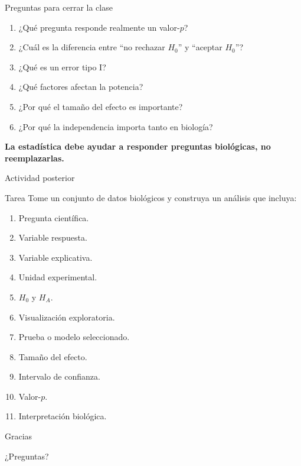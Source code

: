 \begin{frame}{Preguntas para cerrar la clase}

\begin{enumerate}
    \item ¿Qué pregunta responde realmente un valor-$p$?
    \item ¿Cuál es la diferencia entre ``no rechazar $H_0$''
    y ``aceptar $H_0$''?
    \item ¿Qué es un error tipo I?
    \item ¿Qué factores afectan la potencia?
    \item ¿Por qué el tamaño del efecto es importante?
    \item ¿Por qué la independencia importa tanto en biología?
\end{enumerate}

\vspace{0.5cm}

\centering
\Large
\textbf{La estadística debe ayudar a responder preguntas biológicas,
no reemplazarlas.}

\end{frame}

\begin{frame}{Actividad posterior}

\begin{block}{Tarea}
Tome un conjunto de datos biológicos y construya un análisis que incluya:
\end{block}

\begin{enumerate}
    \item Pregunta científica.
    \item Variable respuesta.
    \item Variable explicativa.
    \item Unidad experimental.
    \item $H_0$ y $H_A$.
    \item Visualización exploratoria.
    \item Prueba o modelo seleccionado.
    \item Tamaño del efecto.
    \item Intervalo de confianza.
    \item Valor-$p$.
    \item Interpretación biológica.
\end{enumerate}

\end{frame}

\begin{frame}
\centering
\Huge
\textcolor{bioGreen}{Gracias}

\vspace{0.5cm}

\Large
¿Preguntas?
\end{frame}


